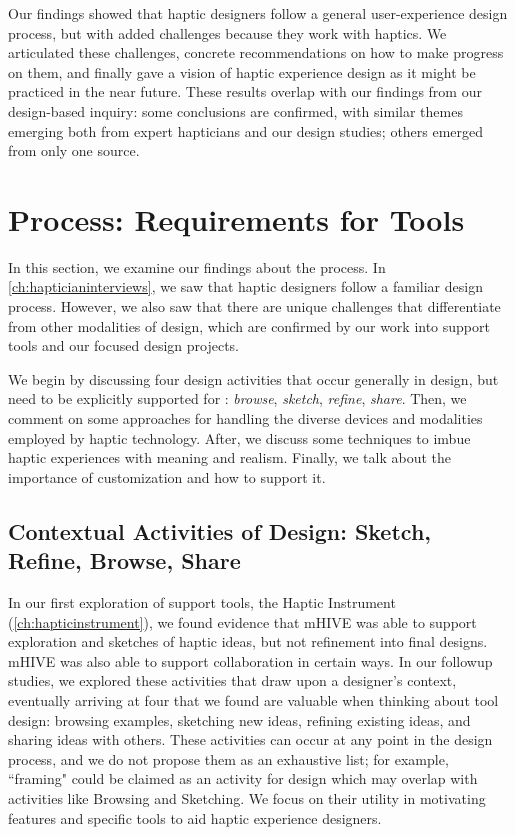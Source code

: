 Our findings showed that haptic designers follow a general user-experience design process, but with added challenges because they work with haptics.
We articulated these challenges, concrete recommendations on how to make progress on them, and finally gave a vision of haptic experience design as it might be practiced in the near future.
These results overlap with our findings from our design-based inquiry: some conclusions are confirmed, with similar themes emerging both from expert hapticians and our design studies; others emerged from only one source.




%
%
\section{\haxd Process: Requirements for Tools}
In this section, we examine our findings about the \haxd process. %
In \autoref{ch:hapticianinterviews}, we saw that haptic designers follow a familiar design process.
However, we also saw that there are unique challenges that differentiate \haxd from other modalities of design, which are confirmed by our work into \haxd support tools and our focused design projects.

We begin by discussing four design activities that occur generally in design, but need to be explicitly supported for \haxd: \emph{browse}, \emph{sketch}, \emph{refine}, \emph{share}.
Then, we comment on some approaches for handling the diverse devices and modalities employed by haptic technology.
After, we discuss some techniques to imbue haptic experiences with meaning and realism.
Finally, we talk about the importance of customization and how to support it.

\subsection{Contextual Activities of Design: Sketch, Refine, Browse, Share}
In our first exploration of \haxd support tools, the Haptic Instrument (\autoref{ch:hapticinstrument}), we found evidence that mHIVE was able to support exploration and sketches of haptic ideas, but not refinement into final designs.
mHIVE was also able to support collaboration in certain ways.
In our followup studies, we explored these activities that draw upon a designer's context, eventually arriving at four that we found are valuable when thinking about tool design: browsing examples, sketching new ideas, refining existing ideas, and sharing ideas with others.
These activities can occur at any point in the design process, and we do not propose them as an exhaustive list; for example, ``framing" \cite{Schon1982,Warr2005} could be claimed as an activity for design which may overlap with activities like Browsing and Sketching.
We focus on their utility in motivating features and specific tools to aid haptic experience designers.



